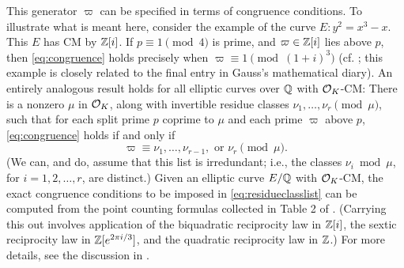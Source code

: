 \documentclass[12pt]{amsart}
\theoremstyle{remark}
\begin{document}
This generator $\varpi$ can be specified in terms of congruence conditions. To illustrate what is meant here, consider the example of the curve $E: y^2=x^3-x$. This $E$ has CM by $\mathbb{Z}[i]$. If $p\equiv 1\pmod{4}$ is prime, and $\varpi \in \mathbb{Z}[i]$ lies above $p$, then \eqref{eq:congruence} holds precisely when $\varpi \equiv 1\pmod{(1+i)^3}$ (cf. \cite[Theorem 5, p. 307]{IR90}; this example is closely related to the final entry in Gauss's mathematical diary). An entirely analogous result holds for all elliptic curves over $\mathbb{Q}$ with $\mathcal{O}_K$-CM: There is a nonzero $\mu$ in $\mathcal{O}_K$, along with invertible residue classes $\nu_1,\dots,\nu_r \pmod{\mu}$, such that for each split prime $p$ coprime to $\mu$ and each prime $\varpi$ above $p$, \eqref{eq:congruence} holds if and only if
\begin{equation}\label{eq:residueclasslist} \varpi \equiv \nu_1, \dots, \nu_{r-1}, \text{ or }\nu_r \pmod{\mu}. \end{equation}
(We can, and do, assume that this list is irredundant; i.e., the classes $\nu_i \bmod{\mu}$, for $i=1,2,\dots, r$, are distinct.) Given an elliptic curve $E/\mathbb{Q}$ with $\mathcal{O}_K$-CM, the exact congruence conditions to be imposed in \eqref{eq:residueclasslist} can be computed from the point counting formulas collected in Table 2 of \cite{JUJ09}. (Carrying this out involves application of the biquadratic reciprocity law in $\mathbb{Z}[i]$, the sextic reciprocity law in $\mathbb{Z}[e^{2\pi i/3}]$, and the  quadratic reciprocity law in $\mathbb{Z}$.) For more details, see the discussion in \cite[\S4]{pollack16}. 

\end{document}
